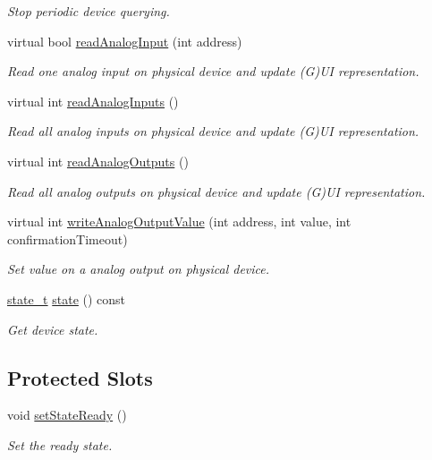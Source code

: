 \begin{DoxyCompactItemize}
\begin{DoxyCompactList}\small\item\em Stop periodic device querying. \end{DoxyCompactList}\item 
virtual bool \hyperlink{classmdt_device_a5059e971d265dcc125e507de856271b9}{readAnalogInput} (int address)
\begin{DoxyCompactList}\small\item\em Read one analog input on physical device and update (G)UI representation. \end{DoxyCompactList}\item 
virtual int \hyperlink{classmdt_device_ac0023742214c29bdadd46383ae240972}{readAnalogInputs} ()
\begin{DoxyCompactList}\small\item\em Read all analog inputs on physical device and update (G)UI representation. \end{DoxyCompactList}\item 
virtual int \hyperlink{classmdt_device_ae0a0f03cb5267232d176896acc80872c}{readAnalogOutputs} ()
\begin{DoxyCompactList}\small\item\em Read all analog outputs on physical device and update (G)UI representation. \end{DoxyCompactList}\item 
virtual int \hyperlink{classmdt_device_a6670e00a26a38b26187604128ea35771}{writeAnalogOutputValue} (int address, int value, int confirmationTimeout)
\begin{DoxyCompactList}\small\item\em Set value on a analog output on physical device. \end{DoxyCompactList}\item 
\hypertarget{classmdt_device_afde11f7cb1d6a932db3824011f7ccccc}{
\hyperlink{classmdt_device_a39c301b1fda803dba0c9ab98164a9d1e}{state\_\-t} \hyperlink{classmdt_device_afde11f7cb1d6a932db3824011f7ccccc}{state} () const }
\label{classmdt_device_afde11f7cb1d6a932db3824011f7ccccc}

\begin{DoxyCompactList}\small\item\em Get device state. \end{DoxyCompactList}\end{DoxyCompactItemize}
\subsection*{Protected Slots}
\begin{DoxyCompactItemize}
\item 
void \hyperlink{classmdt_device_a4eeda85bf0b10ddc9955a32199c00359}{setStateReady} ()
\begin{DoxyCompactList}\small\item\em Set the ready state. \end{DoxyCompactList}\end{DoxyCompactItemize}
